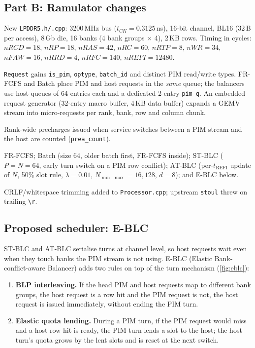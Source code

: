 \documentclass[conference]{IEEEtran}
\newcommand{\cmd}[1]{\texttt{\footnotesize #1}}
\newcommand{\stblc}{ST-BLC}
\newcommand{\atblc}{AT-BLC}
\newcommand{\eblc}{E-BLC}
\newcommand{\trefi}{t_{\mathrm{REFI}}}
\begin{document}
\subsection{Part B: Ramulator changes}
\begin{description}[leftmargin=0pt,labelindent=0pt,font=\bfseries]
\item[LPDDR5-6400 model.] New \cmd{LPDDR5.h/.cpp}: 3200\,MHz bus ($t_{CK}=0.3125$\,ns), 16-bit channel, BL16 (32\,B per access), 8\,Gb die, 16 banks (4 bank groups $\times$ 4), 2\,KB rows. Timing in cycles: $nRCD{=}18$, $nRP{=}18$, $nRAS{=}42$, $nRC{=}60$, $nRTP{=}8$, $nWR{=}34$, $nFAW{=}16$, $nRRD{=}4$, $nRFC{=}140$, $nREFI{=}12480$.
\item[Requests and queues.] \cmd{Request} gains \cmd{is\_pim}, \cmd{optype}, \cmd{batch\_id} and distinct PIM read/write types. FR-FCFS and Batch place PIM and host requests in the \emph{same} queue; the balancers use host queues of 64 entries each and a dedicated 2-entry \cmd{pim\_q}. An embedded request generator (32-entry macro buffer, 4\,KB data buffer) expands a GEMV stream into micro-requests per rank, bank, row and column chunk.
\item[PREA accounting.] Rank-wide precharges issued when service switches between a PIM stream and the host are counted (\cmd{prea\_count}).
\item[Policies.] FR-FCFS; Batch (size 64, older batch first, FR-FCFS inside); \stblc{} ($P{=}N{=}64$, early turn switch on a PIM row conflict); \atblc{} (per-$\trefi$ update of $N$, 50\% slot rule, $\lambda{=}0.01$, $N_{\min,\max}{=}16,128$, $d{=}8$); and \eblc{} below.
\item[Trace parser.] CRLF/whitespace trimming added to \cmd{Processor.cpp}; upstream \cmd{stoul} threw on trailing \cmd{\textbackslash r}.
\end{description}

\subsection{Proposed scheduler: E-BLC}
ST-BLC and AT-BLC serialise turns at channel level, so host requests wait even when they touch banks the PIM stream is not using. \eblc{} (Elastic Bank-conflict-aware Balancer) adds two rules on top of the turn mechanism (\cref{fig:eblc}):
\begin{enumerate}
\item \textbf{BLP interleaving.} If the head PIM and host requests map to different bank groups, the host request is a row hit and the PIM request is not, the host request is issued immediately, without ending the PIM turn.
\item \textbf{Elastic quota lending.} During a PIM turn, if the PIM request would miss and a host row hit is ready, the PIM turn lends a slot to the host; the host turn's quota grows by the lent slots and is reset at the next switch.
\end{enumerate}
\end{document}
